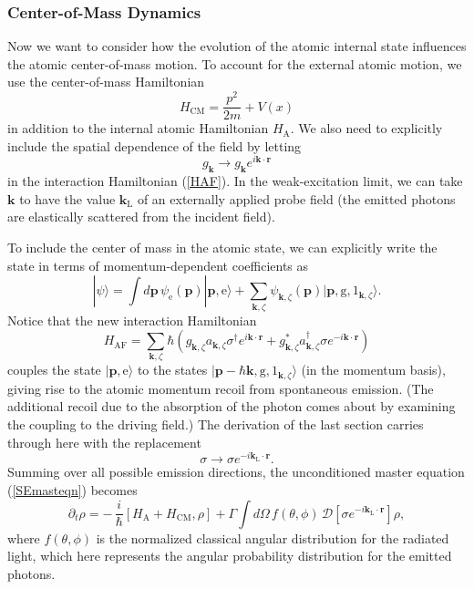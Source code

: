 \documentclass[12pt,aps,onecolum,superscriptaddress,footinbib,floatfix,showpacs]{revtex4-1}
\def\ket#1{|{#1}\rangle}
\def\HAF{H_\mathrm{\scriptscriptstyle AF}}
\def\HA{H_\mathrm{\scriptscriptstyle A}}
\def\HCM{H_\mathrm{\scriptscriptstyle CM}}
\def\kLbf{\mathbf{k}_\mathrm{\scriptscriptstyle L}}
\begin{document}
\subsubsection{Center-of-Mass Dynamics}
Now we want to consider how the evolution of the atomic internal state
influences the atomic center-of-mass motion.
To account for the external atomic motion, we use the center-of-mass
Hamiltonian
\begin{equation}
  \HCM = \frac{p^2}{2m} + V(x)
\end{equation}
in addition to the internal atomic Hamiltonian $\HA$.
We also need to explicitly include the spatial dependence of the field
by letting
\begin{equation}
  g_\mathbf{k}\longrightarrow g_\mathbf{k} e^{i\mathbf{k}\cdot\mathbf{r}}
\end{equation}
in the interaction Hamiltonian (\ref{HAF}).
In the weak-excitation limit, we can take $\mathbf{k}$ to
have the value $\kLbf$ of an externally applied probe field 
(the emitted photons are elastically scattered from the incident field).


To include the center of mass in the atomic state, we can explicitly write the
state in terms of 
momentum-dependent coefficients as
\begin{equation}
  \ket\psi = \int d\mathbf{p}\,\psi_\mathrm{e}(\mathbf{p})\ket{\mathbf{p},\mathrm{e}}
   + \sum_{\mathbf{k},\zeta} \psi_{\mathbf{k},\zeta}(\mathbf{p})\ket{\mathbf{p},\mathrm{g},1_{\mathbf{k},\zeta}}.
\end{equation}
Notice that the new interaction Hamiltonian
\begin{equation}
  \HAF =\sum_{\mathbf{k},\zeta}
      \hbar\left(g_{\mathbf{k},\zeta}a_{\mathbf{k},\zeta}\sigma^\dagger e^{i\mathbf{k}\cdot\mathbf{r}}
          +g^*_{\mathbf{k},\zeta}a^\dagger_{\mathbf{k},\zeta}\sigma e^{-i\mathbf{k}\cdot\mathbf{r}}\right)
  \label{HAFp}
\end{equation}
couples the state $\ket{\mathbf{p},\mathrm{e}}$ 
to the states $\ket{\mathbf{p}-\hbar\mathbf{k},\mathrm{g},1_{\mathbf{k},\zeta}}$
(in the momentum basis),
giving rise to the atomic momentum recoil from spontaneous emission.
(The additional recoil due to the absorption of the photon comes about
by examining the coupling to the driving field.)
The derivation of the last section carries through here with the
replacement 
\begin{equation}
  \sigma\longrightarrow\sigma e^{-i\kLbf\cdot\mathbf{r}}.
\end{equation}
Summing over all possible emission directions, the
unconditioned master equation (\ref{SEmasteqn}) becomes
\begin{equation}
  \partial_t\rho = -\,\frac{i}{\hbar}[\HA+\HCM,\rho] 
  +\Gamma\int d\Omega\, f(\theta,\phi)\, \mathcal{D}\!\left[\sigma e^{-i\kLbf\cdot\mathbf{r}}\right]\rho,
  \label{SEmasteqnwithp}
\end{equation}
where $f(\theta,\phi)$ is the normalized classical angular distribution
for the radiated light, which here represents the angular probability
distribution for the emitted photons.
\end{document}
